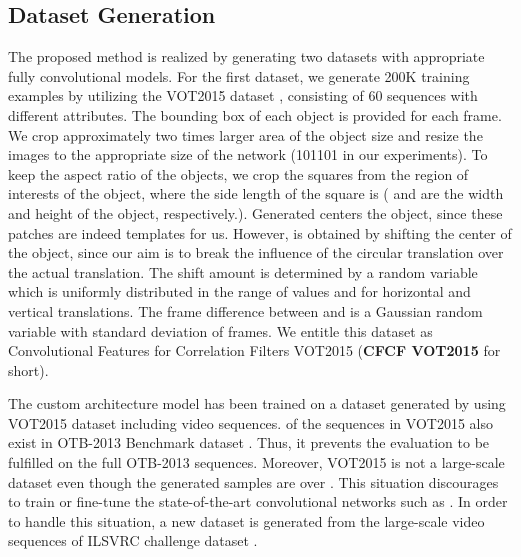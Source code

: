 \documentclass[journal]{IEEEtran}
\begin{document}
\subsection{Dataset Generation}
The proposed method is realized by generating two datasets with appropriate fully convolutional models. For the first dataset,
we generate 200K training examples by utilizing the VOT2015 dataset \cite{VOT2015}, consisting of 60 sequences with different attributes. The bounding box of each object is provided for each frame. We crop approximately two times larger area of the object size and resize the images to the appropriate size of the network (101101 in our experiments). To keep the aspect ratio of the objects, we crop the squares from the region of interests of the object, where the side length of the square is  ( and  are the width and height of the object, respectively.). Generated  centers the object, since these patches are indeed templates for us. However,  is obtained by shifting the center of the object, since our aim is to break the influence of the circular translation over the actual translation. The shift amount is determined by a random variable which is uniformly distributed in the range of values  and  for horizontal and vertical translations. The frame difference between  and  is a Gaussian random variable with standard deviation of  frames. We entitle this dataset as Convolutional Features for Correlation Filters VOT2015 (\textbf{CFCF VOT2015} for short). 

The custom architecture model has been trained on a dataset generated by using VOT2015 dataset including  video sequences.  of the sequences in VOT2015 also exist in OTB-2013 Benchmark dataset \cite{Benchmark2013}. Thus, it prevents the evaluation to be fulfilled on the full OTB-2013 sequences. Moreover, VOT2015 is not a large-scale dataset even though the generated samples are over . This situation discourages to train or fine-tune the state-of-the-art convolutional networks such as \cite{VGG, VGG_verydeep}. In order to handle this situation, a new dataset is generated from the large-scale video sequences of ILSVRC challenge dataset \cite{ILSVRC2015}. 
\end{document}
